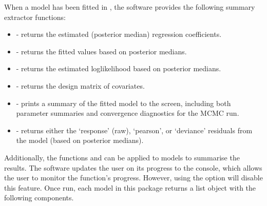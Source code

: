 \documentclass[article, nojss]{jss}
\begin{document}
When a model has been fitted in , the software provides the following summary extractor functions: 


\begin{itemize}
\item {} - returns the estimated (posterior median) regression coefficients. 
\item {} - returns the fitted values based on posterior medians.
\item {} - returns the estimated loglikelihood based on posterior medians.
\item {} - returns the design matrix of covariates.
\item {} - prints a summary of the fitted model to the screen, including both parameter summaries and convergence diagnostics for the MCMC run.
\item {} - returns either the `response' (raw), `pearson', or `deviance' residuals from the model (based on posterior medians).
\end{itemize}

Additionally, the  functions  and  can  be applied to  models to summarise the results. The software updates the user on its progress to the  console, which allows the user to monitor the function's progress. However, using the  option will disable this feature. Once run, each model in this package returns a list object with the following components. 
\end{document}
